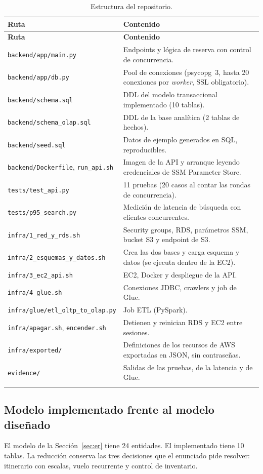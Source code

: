 \documentclass[10pt,letterpaper]{article}
\begin{document}
\begin{longtable}{@{}L{5.0cm} L{10.6cm}@{}}
\toprule \textbf{Ruta} & \textbf{Contenido} \\ \midrule \endfirsthead
\toprule \textbf{Ruta} & \textbf{Contenido} \\ \midrule \endhead
\texttt{backend/app/main.py} & Endpoints y lógica de reserva con control de concurrencia. \\
\texttt{backend/app/db.py} & Pool de conexiones (psycopg~3, hasta 20 conexiones por \emph{worker}, SSL obligatorio). \\
\texttt{backend/schema.sql} & DDL del modelo transaccional implementado (10 tablas). \\
\texttt{backend/schema\_olap.sql} & DDL de la base analítica (2 tablas de hechos). \\
\texttt{backend/seed.sql} & Datos de ejemplo generados en SQL, reproducibles. \\
\texttt{backend/Dockerfile}, \texttt{run\_api.sh} & Imagen de la API y arranque leyendo credenciales de SSM Parameter Store. \\
\texttt{tests/test\_api.py} & 11 pruebas (20 casos al contar las rondas de concurrencia). \\
\texttt{tests/p95\_search.py} & Medición de latencia de búsqueda con clientes concurrentes. \\
\texttt{infra/1\_red\_y\_rds.sh} & Security groups, RDS, parámetros SSM, bucket S3 y endpoint de S3. \\
\texttt{infra/2\_esquemas\_y\_datos.sh} & Crea las dos bases y carga esquema y datos (se ejecuta dentro de la EC2). \\
\texttt{infra/3\_ec2\_api.sh} & EC2, Docker y despliegue de la API. \\
\texttt{infra/4\_glue.sh} & Conexiones JDBC, crawlers y job de Glue. \\
\texttt{infra/glue/etl\_oltp\_to\_olap.py} & Job ETL (PySpark). \\
\texttt{infra/apagar.sh}, \texttt{encender.sh} & Detienen y reinician RDS y EC2 entre sesiones. \\
\texttt{infra/exported/} & Definiciones de los recursos de AWS exportadas en JSON, sin contraseñas. \\
\texttt{evidence/} & Salidas de las pruebas, de la latencia y de Glue. \\
\bottomrule
\caption{Estructura del repositorio.}
\end{longtable}

\subsection{Modelo implementado frente al modelo diseñado}
El modelo de la Sección~\ref{sec:er} tiene 24 entidades. El implementado tiene 10 tablas. La reducción conserva las tres decisiones que el enunciado pide resolver: itinerario con escalas, vuelo recurrente y control de inventario.
\end{document}
